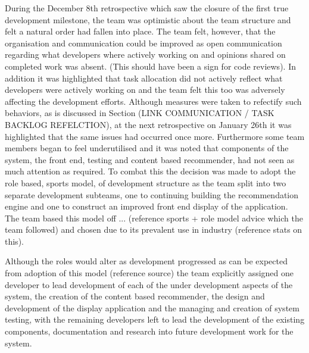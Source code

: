 \documentclass{l3proj}
\begin{document}
During the December 8th retrospective which saw the closure of the first true development milestone, the team was optimistic about the team structure and felt a natural order had fallen into place. The team felt, however, that the organisation and communication could be improved as open communication regarding what developers where actively working on and opinions shared on completed work was absent. (This should have been a sign for code reviews). In addition it was highlighted that task allocation did not actively reflect what developers were actively working on and the team felt this too was adversely affecting the development efforts. Although measures were taken to refectify such behaviors, as is discussed in Section (LINK COMMUNICATION / TASK BACKLOG REFELCTION), at the next retrospective on January 26th it was highlighted that the same issues had occurred once more. Furthermore some team members began to feel underutilised and it was noted that components of the system, the front end, testing and content based recommender, had not seen as much attention as required. To combat this the decision was made to adopt the role based, sports model, of development structure as the team split into two separate development subteams, one to continuing building the recommendation engine and one to construct an improved front end display of the application. The team based this model off ... (reference sports + role model advice which the team followed) and chosen due to its prevalent use in industry (reference stats on this).

Although the roles would alter as development progressed as can be expected from adoption of this model (reference source) the team explicitly assigned one developer to lead development of each of the under development aspects of the system, the creation of the content based recommender, the design and development of the display application and the managing and creation of system testing, with the remaining developers left to lead the development of the existing components, documentation and research into future development work for the system. 
\end{document}

